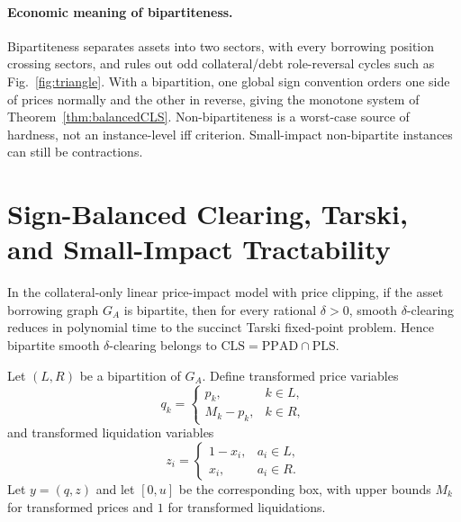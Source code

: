 \documentclass{llncs}
\newcommand{\GA}{G_A}
\begin{document}
\paragraph{Economic meaning of bipartiteness.}
Bipartiteness separates assets into two sectors, with every borrowing position crossing sectors, and rules out odd collateral/debt role-reversal cycles such as Fig.~\ref{fig:triangle}.  With a bipartition, one global sign convention orders one side of prices normally and the other in reverse, giving the monotone system of Theorem~\ref{thm:balancedCLS}.  Non-bipartiteness is a worst-case source of hardness, not an instance-level iff criterion. Small-impact non-bipartite instances can still be contractions.

\section{Sign-Balanced Clearing, Tarski, and Small-Impact Tractability}
\label{sec:tractability}
\begin{theorem}
\label{thm:balancedCLS}
In the collateral-only linear price-impact model with price clipping, if the asset borrowing graph \(\GA\) is bipartite, then for every rational \(\delta>0\), smooth \(\delta\)-clearing reduces in polynomial time to the succinct Tarski fixed-point problem. Hence bipartite smooth \(\delta\)-clearing belongs to \(\mathrm{CLS}=\mathrm{PPAD}\cap\mathrm{PLS}\).
\end{theorem}

Let \((L,R)\) be a bipartition of \(\GA\). Define transformed price variables
\begin{equation}
q_k=\begin{cases}p_k,&k\in L,\\ M_k-p_k,&k\in R,
\end{cases}
\end{equation}
and transformed liquidation variables
\begin{equation}
z_i=\begin{cases}1-x_i,&a_i\in L,\\ x_i,&a_i\in R.
\end{cases}
\end{equation}
Let \(y=(q,z)\) and let \([0,u]\) be the corresponding box, with upper bounds \(M_k\) for transformed prices and \(1\) for transformed liquidations.
\end{document}

